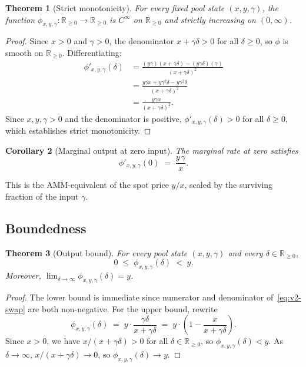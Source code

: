 \documentclass[11pt,a4paper]{article}
\newtheorem{theorem}{Theorem}[section]
\newtheorem{corollary}[theorem]{Corollary}
\theoremstyle{definition}
\newcommand{\R}{\mathbb{R}}
\newcommand{\Rnn}{\R_{\geq 0}}
\begin{document}
\begin{theorem}[Strict monotonicity]
\label{thm:v2-mono}
For every fixed pool state $(x,y,\gamma)$, the function
$\phi_{x,y,\gamma} : \Rnn \to \Rnn$ is $C^\infty$ on $\Rnn$ and strictly
increasing on $(0, \infty)$.
\end{theorem}

\begin{proof}
Since $x > 0$ and $\gamma > 0$, the denominator $x + \gamma \delta > 0$ for all
$\delta \geq 0$, so $\phi$ is smooth on $\Rnn$. Differentiating:
\begin{align*}
    \phi'_{x,y,\gamma}(\delta)
    &= \frac{(y\gamma)(x + \gamma\delta) - (y\gamma\delta)(\gamma)}{(x + \gamma\delta)^2} \\
    &= \frac{y\gamma x + y\gamma^2 \delta - y\gamma^2 \delta}{(x + \gamma\delta)^2} \\
    &= \frac{y \gamma x}{(x + \gamma\delta)^2}.
\end{align*}
Since $x, y, \gamma > 0$ and the denominator is positive,
$\phi'_{x,y,\gamma}(\delta) > 0$ for all $\delta \geq 0$, which establishes strict
monotonicity.
\end{proof}

\begin{corollary}[Marginal output at zero input]
\label{cor:marginal}
The \emph{marginal rate at zero} satisfies
\[
    \phi'_{x,y,\gamma}(0) \;=\; \frac{y \, \gamma}{x}.
\]
\end{corollary}

\noindent This is the AMM-equivalent of the spot price $y/x$, scaled by the
surviving fraction of the input $\gamma$.

\subsection{Boundedness}

\begin{theorem}[Output bound]
\label{thm:v2-bounded}
For every pool state $(x,y,\gamma)$ and every $\delta \in \Rnn$,
\[
    0 \;\leq\; \phi_{x,y,\gamma}(\delta) \;<\; y.
\]
Moreover, $\lim_{\delta \to \infty} \phi_{x,y,\gamma}(\delta) = y$.
\end{theorem}

\begin{proof}
The lower bound is immediate since numerator and denominator
of~\eqref{eq:v2-swap} are both non-negative. For the upper bound, rewrite
\[
    \phi_{x,y,\gamma}(\delta) \;=\; y \cdot \frac{\gamma\delta}{x + \gamma\delta}
    \;=\; y \cdot \left( 1 - \frac{x}{x + \gamma\delta} \right).
\]
Since $x > 0$, we have $x/(x + \gamma\delta) > 0$ for all $\delta \in \Rnn$, so
$\phi_{x,y,\gamma}(\delta) < y$. As $\delta \to \infty$, $x/(x + \gamma\delta) \to 0$,
so $\phi_{x,y,\gamma}(\delta) \to y$.
\end{proof}
\end{document}
